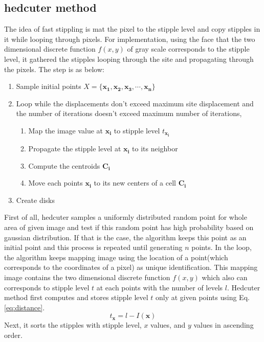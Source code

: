\documentclass[11pt]{article}
\begin{document}
\subsection{hedcuter method}
The idea of fast stippling\cite{secord02} is mat the pixel to the stipple level  and copy stipples in it while looping through pixels.
For implementation, using the face that the two dimensional discrete function $f(x,y)$ of gray scale corresponds to the stipple level, it gathered the stipples looping through the site and propagating through the pixels.
The step is as below:
\begin{enumerate}
\item Sample initial points $X=\{\mathbf{x_1, x_2, x_3, \cdots, x_n}\}$
\item Loop while the displacements don't exceed maximum site displacement and the number of iterations doesn't exceed maximum number of iterations,
\begin{enumerate}
\item Map the image value at $\mathbf{x_i}$ to stipple level $t_{\mathbf{x_i}}$
\item Propagate the stipple level at $\mathbf{x_i}$ to its neighbor
\item Compute the centroids $\mathbf{C_i}$
\item Move each points $\mathbf{x_i}$ to its new centers of a cell $\mathbf{C_i}$
\end{enumerate}
\item Create disks
\end{enumerate}
First of all, hedcuter samples a uniformly distributed random point for whole area of given image and test if this random point has high probability based on gaussian distribution. If that is the case, the algorithm keeps this point as an initial point and this process is repeated until generating $n$ points.
In the loop, the algorithm keeps mapping image using the location of a point(which corresponds to the coordinates of a pixel) as unique identification. This mapping image contains the two dimensional discrete function $f(x,y)$ which also can corresponds to stipple level $t$ at each points with the number of levels $l$. Hedcuter method first computes and stores stipple level $t$ only at given points using Eq. \ref{eq:distance}.
\begin{equation}\label{eq:distance}
t_{\mathbf{x}}=l-I(\mathbf{x})
\end{equation}
Next, it sorts the stipples with stipple level, $x$ values, and $y$ values in ascending order.
\end{document}
